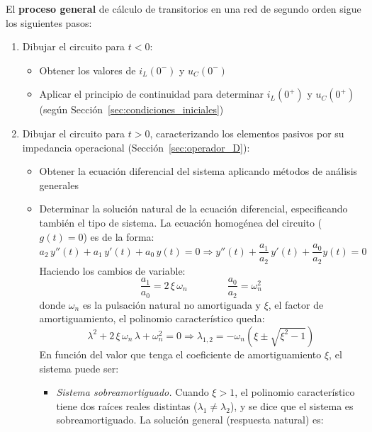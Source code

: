 El \textbf{proceso general} de cálculo de transitorios en una red de
segundo orden sigue los siguientes pasos:
\begin{enumerate}
\item Dibujar el circuito para $t < 0$:
  \begin{itemize}
  \item Obtener los valores de $i_L(0^-)$ y $u_C(0^-)$
  \item Aplicar el principio de continuidad para determinar $i_L(0^+)$
    y $u_C(0^+)$ (según Sección~\ref{sec:condiciones_iniciales})
  \end{itemize}
\item Dibujar el circuito para \(t > 0\), caracterizando los elementos
  pasivos por su impedancia operacional
  (Sección~\ref{sec:operador_D}):
  \begin{itemize}
  \item Obtener la ecuación diferencial del sistema aplicando métodos
    de análisis generales
  \item Determinar la solución natural de la ecuación diferencial,
    especificando también el tipo de sistema. La ecuación homogénea
    del circuito ($g(t)=0$) es de la forma:
    \begin{equation*}
      a_2\,y''(t)+a_1\,y'(t)+a_0\,y(t)=0\Rightarrow {y''(t)+\dfrac{a_1}{a_2}\,y'(t)+\dfrac{a_0}{a_2}y(t)=0}
    \end{equation*}
    Haciendo los cambios de variable:
    \begin{equation}\label{eq:xi-omega_n}
      {\dfrac{a_1}{a_0}=2\,\xi\,\omega_n}\qquad \qquad
      {\dfrac{a_0}{a_2}=\omega_n^2}
    \end{equation}
    donde $\omega_n$ es la pulsación natural no amortiguada y $\xi$,
    el factor de amortiguamiento, el polinomio característico queda:
    \begin{equation*}
      \lambda^2+2\,\xi\,\omega_n\,\lambda + \omega_n^2=0 \Rightarrow \lambda_{1,2}=-\omega_n\left(\xi\pm\sqrt{\xi^2-1} \right)
    \end{equation*}
    En función del valor que tenga el coeficiente de amortiguamiento
    $\xi$, el sistema puede ser:
    \begin{itemize}
    \item \textit{Sistema sobreamortiguado.} Cuando $\xi>1$, el
      polinomio característico tiene {dos raíces reales distintas}
      ($\lambda_1\neq\lambda_2$), y se dice que el sistema es
      {sobreamortiguado}. La solución general (respuesta natural) es:
      \begin{equation*}

\end{equation*}
\end{itemize}
\end{itemize}
\end{enumerate}
